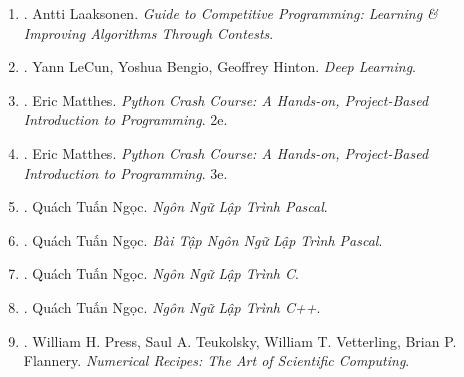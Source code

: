 \documentclass{article}
\begin{document}
\begin{enumerate}
	\item \cite{Laaksonen2020}. Antti Laaksonen. {\it Guide to Competitive Programming: Learning \& Improving Algorithms Through Contests}.\hfill{\sf[reading]}
	
	\item \cite{LeCun_Bengio_Hinton2015}. Yann LeCun, Yoshua Bengio, Geoffrey Hinton. {\it Deep Learning}.\hfill{\sf[reading]}
	
	\item \cite{Matthes2019}. Eric Matthes. {\it Python Crash Course: A Hands-on, Project-Based Introduction to Programming}. 2e.\hfill{\sf[reading]}
	
	\item \cite{Matthes2023}. Eric Matthes. {\it Python Crash Course: A Hands-on, Project-Based Introduction to Programming}. 3e.\hfill{\sf[reading]}
	
	\item \cite{Ngoc_Pascal}. Quách Tuấn Ngọc. {\it Ngôn Ngữ Lập Trình Pascal}.\hfill{\sf[reading]}
	
	\item \cite{Ngoc_BT_Pascal}. Quách Tuấn Ngọc. {\it Bài Tập Ngôn Ngữ Lập Trình Pascal}.\hfill{\sf[reading]}
	
	\item \cite{Ngoc_C}. Quách Tuấn Ngọc. {\it Ngôn Ngữ Lập Trình C}.\hfill{\sf[reading]}
	
	\item \cite{Ngoc_C++}. Quách Tuấn Ngọc. {\it Ngôn Ngữ Lập Trình C++}.\hfill{\sf[done]}
	
	\item \cite{Press_Teukolsky_Vetterling_Flannery_recipe_C++}. {\sc William H. Press, Saul A. Teukolsky, William T. Vetterling, Brian P. Flannery}. {\it Numerical Recipes: The Art of Scientific Computing}. {}
	

\end{enumerate}
\end{document}
